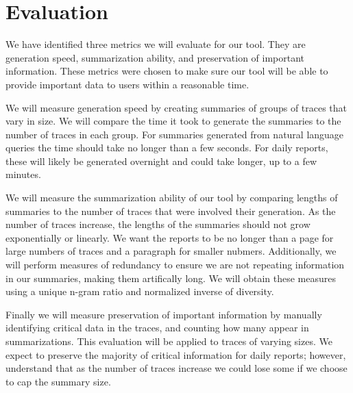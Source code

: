 \section{Evaluation}

We have identified three metrics we will evaluate for our tool. They are generation speed, summarization ability,
and preservation of important information. These metrics were chosen to make sure our tool will be able to provide 
important data to users within a reasonable time. 

We will measure generation speed by creating summaries of groups of traces that vary in size. We will compare the time it took 
to generate the summaries to the number of traces in each group. For summaries generated from natural language queries the time
should take no longer than a few seconds. For daily reports, these will likely be generated overnight and could take longer, 
up to a few minutes. 

We will measure the summarization ability of our tool by comparing lengths of summaries to the number of traces that were involved
their generation. As the number of traces increase, the lengths of the summaries should not grow exponentially or linearly. We want the 
reports to be no longer than a page for large numbers of traces and a paragraph for smaller nubmers. Additionally, we will perform measures 
of redundancy to ensure we are not repeating information in our summaries, making them artifically long. We will obtain these measures using
a unique n-gram ratio and normalized inverse of diversity.

Finally we will measure preservation of important information by manually identifying critical data in the traces, and counting how many
appear in summarizations. This evaluation will be applied to traces of varying sizes. We expect to preserve the majority of critical 
information for daily reports; however, understand that as the number of traces increase we could lose some if we choose to cap the 
summary size. 